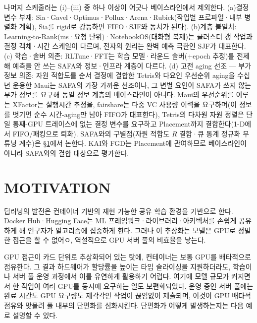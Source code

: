 \documentclass{ieeetj}
\begin{document}
나머지 스케줄러는 (i)--(iii) 중 하나 이상이 어긋나 베이스라인에서 제외한다. (a)결정 변수 부재: Sia·Gavel\cite{narayanan2020gavel}·Optimus·Pollux·Arena·Rubick(작업별 프로파일·내부 병렬화 계획), Sia를 rigid로 강등하면 FIFO·SJF와 동치가 된다). (b)계층 불일치: Learning-to-Rank(ms·요청 단위)·NotebookOS(대화형 복제)는 클러스터 갱 작업과 결정 객체·시간 스케일이 다르며, 전자의 원리는 완벽 예측 극한인 SJF가 대표한다. (c) 학습·솔버 의존: RLTune·FFT는 학습 모델·라운드 솔버($+$epoch 추정)를 전제해 예측을 안 쓰는 SAFA와 정보·인프라 계층이 다르다. (d) 고전 aging 선조 --- 부가 정보 의존: 자원 적합도를 순서 결정에 결합한 Tetris\cite{grandl2014multi}와 다요인 우선순위 aging을 수십 년 운용한 Maui\cite{jackson2001maui}는 SAFA의 가장 가까운 선조이나, 그 변별 요인이 SAFA가 쓰지 않는 부가 정보를 요구해 동일 정보 계층의 베이스라인이 아니다. Maui의 우선순위를 이루는 XFactor는 실행시간 추정을, fairshare는 다중 VC 사용량 이력을 요구하며(이 정보를 벗기면 순수 시간-aging만 남아 FIFO가 대표한다), Tetris의 다차원 자원 정렬은 단일 통째-GPU 트레이스에 없는 결정 변수를 요구하고 Placement까지 결합한다(1-D에서 FIFO/패킹으로 퇴화). SAFA와의 구별점(자원 적합도 $R$ 결합·큐 통계 정규화 무튜닝 계수)은 \S\ref{motivation}에서 논한다. KAI와 FGD는 Placement에 관여하므로 베이스라인이 아니라 SAFA와의 결합 대상으로 평가한다.


\section{MOTIVATION}\label{motivation}
딥러닝의 발전은 컨테이너\cite{b7} 기반의 재현 가능한 공유 학습 환경을 기반으로 한다. Docker Hub\cite{b8}·Hugging Face\cite{b9}는 ML 프레임워크·라이브러리·아키텍처를 손쉽게 공유하게 해 연구자가 알고리즘에 집중하게 한다. 그러나 이 추상화는 모델은 GPU로 정밀한 접근을 할 수 없어ㅇ, 역설적으로 GPU 서버 풀의 비효율을 낳는다.

GPU 접근이 카드 단위로 추상화되어 있는 탓에, 컨테이너는 보통 GPU를 배타적으로 점유한다. 그 결과 하드웨어가 할당률을 높이는 타임 슬라이싱을 지원하더라도, 학습이나 서버 풀 운영 과정에서 이를 유연하게 활용하기 어렵다. 여기에 모델 규모가 커지면서 한 작업이 여러 GPU를 동시에 요구하는 일도 보편화되었다. 운영 중인 서버 풀에는 완료 시간도 GPU 요구량도 제각각인 작업이 끊임없이 제출되며, 이것이 GPU 배타적 점유와 맞물려 풀 내부의 단편화를 심화시킨다. 단편화가 어떻게 발생하는지는 다음 예로 설명할 수 있다.
\end{document}
